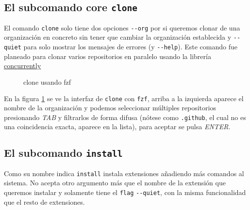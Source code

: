 \subsection{El subcomando core {\tt clone}}
El comando \verb|clone| solo tiene dos opciones \verb|--org| por si queremos clonar de una organización en concreto sin tener que cambiar la organización establecida y \verb|--quiet| para solo mostrar los mensajes de errores (y \verb|--help|).
Este comando fue planeado para clonar varios repositorios en paralelo usando la librería \href{https://www.npmjs.com/package/concurrently}{concurrently}

\begin{figure}[H]
    \centering
    \caption{clone usando fzf}
    \label{fig:clone}
\end{figure}

En la figura \ref{fig:clone} se ve la interfaz de \verb|clone| con \verb|fzf|, arriba a la izquierda aparece el nombre de la organización y podemos seleccionar múltiples repositorios presionando \emph{TAB} y filtrarlos de forma difusa (nótese como \verb|.github|, el cual no es una coincidencia exacta, aparece en la lista), para aceptar se pulsa \emph{ENTER}.

\subsection{El subcomando {\tt install}}
Como su nombre indica \verb|install| instala extensiones añadiendo más comandos al sistema. No acepta otro argumento más que el nombre de la extensión que queremos instalar y solamente tiene el \verb|flag| \verb|--quiet|, con la misma funcionalidad que el resto de extensiones.


